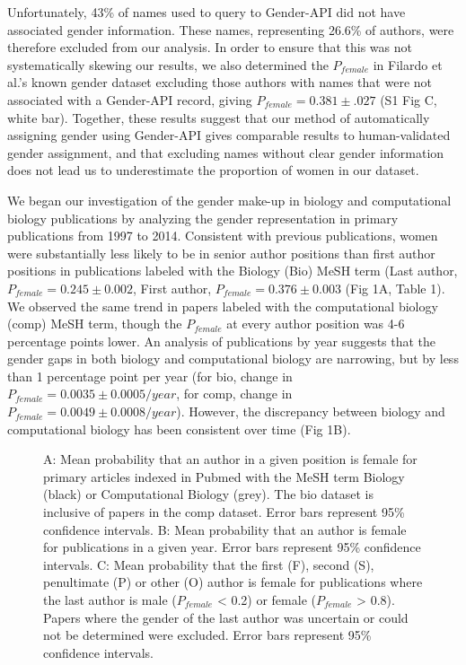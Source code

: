 \documentclass[10pt,letterpaper]{article}
\begin{document}
\begin{flushleft}
Unfortunately, 43\% of names used to query to Gender-API did not have associated gender information. These names, representing 26.6\% of authors, were therefore excluded from our analysis. In order to ensure that this was not systematically skewing our results, we also determined the $P_{female}$ in Filardo et al.'s known gender dataset excluding those authors with names that were not associated with a Gender-API record, giving $P_{female} = 0.381 \pm .027$ (S1 Fig C, white bar). Together, these results suggest that our method of automatically assigning gender using Gender-API gives comparable results to human-validated gender assignment, and that excluding names without clear gender information does not lead us to underestimate the proportion of women in our dataset.

We began our investigation of the gender make-up in biology and computational biology publications by analyzing the gender representation in primary publications from 1997 to 2014. Consistent with previous publications, women were substantially less likely to be in senior author positions than first author positions in publications labeled with the Biology (Bio) MeSH term (Last author, $P_{female} = 0.245 \pm 0.002$, First author, $P_{female} = 0.376 \pm 0.003$ (Fig 1A, Table 1). We observed the same trend in papers labeled with the computational biology (comp) MeSH term, though the $P_{female}$ at every author position was 4-6  percentage points lower. An analysis of publications by year suggests that the gender gaps in both biology and computational biology are narrowing, but by less than 1 percentage point  per year (for bio, change in $P_{female} = 0.0035 \pm 0.0005 / year$, for comp, change in $P_{female} = 0.0049 \pm 0.0008 / year$). However, the discrepancy between biology and computational biology has been consistent over time (Fig 1B).

\begin{figure}[!h]
  \caption{
  A: Mean probability that an author in a given position is female for primary articles indexed in Pubmed with the MeSH term Biology (black) or Computational Biology (grey). The bio dataset is inclusive of papers in the comp dataset. Error bars represent 95\% confidence intervals. B: Mean probability that an author is female for publications in a given year. Error bars represent 95\% confidence intervals. C: Mean probability that the first (F), second (S), penultimate (P) or other (O) author is female for publications where the last author is male ($P_{female}$ < 0.2) or female ($P_{female}$ > 0.8). Papers where the gender of the last author was uncertain or could not be determined were excluded. Error bars represent 95\% confidence intervals.}
  \label{fig1}
\end{figure}


\end{flushleft}
\end{document}
